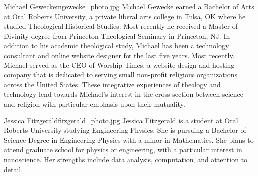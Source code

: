 \begin{authorbio}{Michael Gewecke}{mgewecke_photo.jpg}{}
Michael Gewecke earned a Bachelor of Arts at Oral Roberts University, a private liberal arts college in Tulsa, OK where he studied Theological Historical Studies.  Most recently he received a Master of Divinity degree from Princeton Theological Seminary in Princeton, NJ.  In addition to his academic theological study, Michael has been a technology consultant and online website designer for the last five years.  Most recently, Michael served as the CEO of Worship Times, a website design and hosting company that is dedicated to serving small non-profit religious organizations across the United States.  These integrative experiences of theology and technology lend towards Michael's interest in the cross section between science and religion with particular emphasis upon their mutuality.   
\end{authorbio}

\begin{authorbio}{Jessica Fitzgerald}{fitzgerald_photo.jpg}{}
Jessica Fitzgerald is a student at Oral Roberts University studying Engineering Physics.  She is pursuing a Bachelor of Science Degree in Engineering Physics with a minor in Mathematics. She plans to attend graduate school for physics or engineering, with a particular interest in nanoscience. Her strengths include data analysis, computation, and attention to detail.
\end{authorbio}

~

